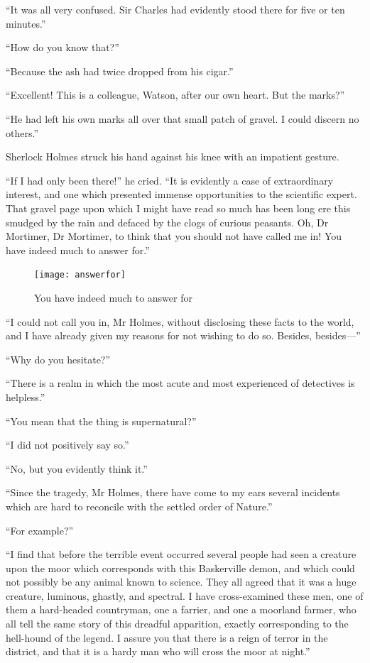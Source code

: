 \documentclass[paper=5.5in:8.5in,BCOR=7mm,twoside,DIV=calc,12pt,usegeometry,openany,chapterprefix,endperiod]{scrbook} %
\begin{document}
\enquote{It was all very confused. Sir Charles had evidently stood there for five or ten minutes.}

\enquote{How do you know that?}

\enquote{Because the ash had twice dropped from his cigar.}

\enquote{Excellent! This is a colleague, Watson, after our own heart. But the marks?}

\enquote{He had left his own marks all over that small patch of gravel. I could discern no others.}

Sherlock Holmes struck his hand against his knee with an impatient gesture.

\enquote{If I had only been there!} he cried. \enquote{It is evidently a case of extraordinary interest, and one which presented immense opportunities to the scientific expert. That gravel page upon which I might have read so much has been long ere this smudged by the rain and defaced by the clogs of curious peasants. Oh, Dr Mortimer, Dr Mortimer, to think that you should not have called me in! You have indeed much to answer for.}

\begin{figure}[tbhp]
\centering
\texttt{[image: answerfor]}
\caption{You have indeed much to answer for}
\end{figure}

\afterpage{\clearpage}

\enquote{I could not call you in, Mr Holmes, without disclosing these facts to the world, and I have already given my reasons for not wishing to do so. Besides, besides\nobreakdash---}

\enquote{Why do you hesitate?}

\enquote{There is a realm in which the most acute and most experienced of detectives is helpless.}

\enquote{You mean that the thing is supernatural?}

\enquote{I did not positively say so.}

\enquote{No, but you evidently think it.}

\enquote{Since the tragedy, Mr Holmes, there have come to my ears several incidents which are hard to reconcile with the settled order of Nature.}

\enquote{For example?}

\enquote{I find that before the terrible event occurred several people had seen a creature upon the moor which corresponds with this Baskerville demon, and which could not possibly be any animal known to science. They all agreed that it was a huge creature, luminous, ghastly, and spectral. I have cross-examined these men, one of them a hard-headed countryman, one a farrier, and one a moorland farmer, who all tell the same story of this dreadful apparition, exactly corresponding to the hell-hound of the legend. I assure you that there is a reign of terror in the district, and that it is a hardy man who will cross the moor at night.}
\end{document}

